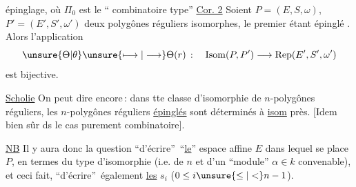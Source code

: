 épinglage, où $\Pi_0$ est le `` combinatoire type''
\uline{Cor. 2} Soient $P=(E,S,\omega)$, $P'=(E',S',\omega')$ deux
polygônes réguliers isomorphes,  le
premier étant épinglé . Alors l'application
\[
\unsure{\Theta|\theta}\unsure{\longmapsto|\longrightarrow}\Theta(r)\,:\quad \operatorname{Isom}(P,P')\longrightarrow\operatorname{Rep}(E',S',\omega')
\]
est bijective.

\uline{Scholie} On peut dire encore\,: dans tte
classe d'isomorphie de $n$-polygônes
réguliers, les $n$-polygônes réguliers \uline{épinglés}
sont déterminés à \uline{isom}  près.
[Idem bien sûr ds le cas purement
combinatoire]. 

\uline{NB} Il y aura donc la question ``d'écrire''\
``\uline{le}'' espace affine $E$ dans lequel se
place $P$, en termes du type d'isomorphie
(i.e. de $n$ et d'un
``module'' $\alpha\in k$ convenable),  et ceci fait, ``d'écrire''\
également \uline{les}   $s_i$ ($0\leq i\unsure{\leq|<} n-1$).

